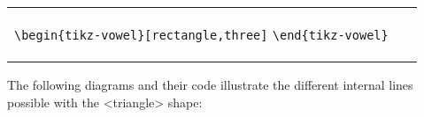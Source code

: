 \documentclass{article}
\def\\{}%
\def\texttt#1{<#1>}%
\begin{document}
\begin{center}
\begin{tabular}{ll}
  \begin{minipage}[t]{6.5cm}{\small
    \verb|\begin{tikz-vowel}[rectangle,three]|\\
    \verb|\end{tikz-vowel}|\\}
  \end{minipage} & 
  \begin{minipage}[t]{6.5cm}
  {~}
  \end{minipage} \\
  \begin{minipage}[t]{6.5cm}{
  \begin{tikz-vowel}\end{tikz-vowel} \\}\end{minipage} &
\end{tabular}
\end{center}

\noindent
The following diagrams and their code illustrate the different internal lines possible with the \texttt{triangle} shape:
\end{document}
